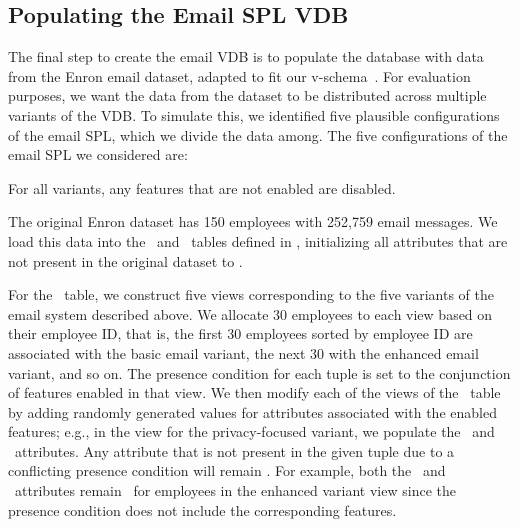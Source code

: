 \subsection{Populating the Email SPL VDB}
\label{sec:enron-pop}

The final step to create the email VDB is to populate the database with data
from the Enron email dataset, adapted to fit our v-schema~\cite{Shetty04}.
%
For evaluation purposes, we want the data from the dataset to be distributed
across multiple variants of the VDB. To simulate this, we identified five
plausible configurations of the email SPL, which we divide the data among. The
five configurations of the email SPL 
 we considered are:
%
%
For all variants, any features that are not enabled are disabled. 


The original Enron dataset has 150 employees with 252,759 email messages. 
%
We load this data into the \employees\ and \messages\ tables defined in
, initializing all attributes that are not present in the
original dataset to \nul.


For the \employees\ table, we construct five views corresponding to the five
variants of the email system described above. We allocate 30 employees to each
view based on their employee ID, that is, the first 30 employees sorted by
employee ID are associated with the basic email variant, the next 30 with the
enhanced email variant, and so on. The presence condition for each tuple is set
to the conjunction of features enabled in that view.
%
We then modify each of the views of the \employees\ table by adding randomly
generated values for attributes associated with the enabled features; 
e.g., in the view for the privacy-focused variant, we populate the
\verificationkey\ and \publickey\ attributes.
%
Any attribute that is not present in the given tuple due to a conflicting
presence condition will remain \nul. For example, both the \verificationkey\
and \publickey\ attributes remain \nul\ for employees in the enhanced variant
view since the presence condition does not include the corresponding features.



